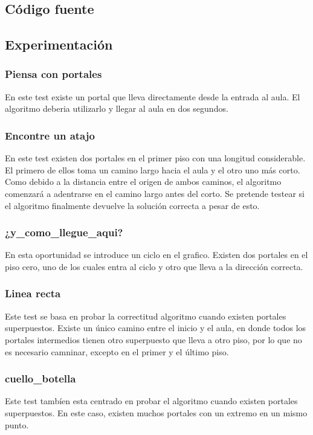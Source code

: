 \subsection{Código fuente}

\subsection{Experimentación}
\subsubsection{Piensa con portales}
En este test existe un portal que lleva directamente desde la entrada al aula. El algoritmo deberia utilizarlo y llegar al aula en dos segundos.

\subsubsection{Encontre un atajo}
En este test existen dos portales en el primer piso con una longitud considerable. El primero de ellos toma un camino largo hacia el aula y el otro uno más corto. Como debido a la distancia entre el origen de ambos caminos, el algoritmo comenzará a adentrarse en el camino largo antes del corto. Se pretende testear si el algoritmo finalmente devuelve la solución correcta a pesar de esto.

\subsubsection{¿y_como_llegue_aqui?}
En esta oportunidad se introduce un ciclo en el grafico. Existen dos portales en el piso cero, uno de los cuales entra al ciclo y otro que lleva a la dirección correcta.

\subsubsection{Linea recta}
Este test se basa en probar la correctitud algoritmo cuando existen portales superpuestos. Existe un único camino entre el inicio y el aula, en donde todos los portales intermedios tienen otro superpuesto que lleva a otro piso, por lo que no es necesario camninar, excepto en el primer y el último piso.

\subsubsection{cuello_botella}
Este test tambíen esta centrado en probar el algoritmo cuando existen portales superpuestos. En este caso, existen muchos portales con un extremo en un mismo punto.

